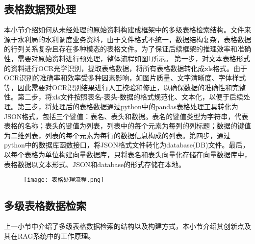 \subsection{表格数据预处理}
本小节介绍如何从未经处理的原始资料构建成框架中的多级表格检索结构。文件来源于水利局的水利调度业务资料，由于文件格式不统一，数据结构复杂，表格数据的行列关系复杂且存在多种模态的表格文件。为了保证后续框架的推理效率和准确性，需要对原始资料进行预处理，整体流程如图\ref{fig:4-3}所示。
第一步，对文本表格形式的资料进行OCR光学识别，提取表格数据，将所有表格数据转化成xls格式。由于OCR识别的准确率和效率受多种因素影响，如图片质量、文字清晰度、字体样式等，因此需要对OCR识别结果进行人工校验和修正，以确保数据的准确性和完整性。第二步，将xls文件按照表名-表头-数据的格式规范化、文本化，以便于后续处理。第三步，将处理后的表格数据通过python中的pandas表格处理工具转化为JSON格式，包括三个键值：表名、表头和数据。表名的键值类型为字符串，代表表格的名称；表头的键值为列表，列表中的每个元素为每列的列标题；数据的键值为二维列表，列表的每个元素为每行的数据信息构成的列表。第四步，通过python中的数据库函数接口，将JSON格式文件转化为database(DB)文件。最后，以每个表格为单位构建向量数据库，只将表名和表头向量化存储在向量数据库中，表格数据以文本形式、JSON和database的形式存储在本地。

\begin{figure}[h]
    \centering
    \texttt{[image: 表格处理流程.png]}
    \label{fig:4-3}
\end{figure}
\subsection{多级表格数据检索}

上一小节中介绍了多级表格数据检索的结构以及构建方式，本小节介绍其创新点及其在RAG系统中的工作原理。

